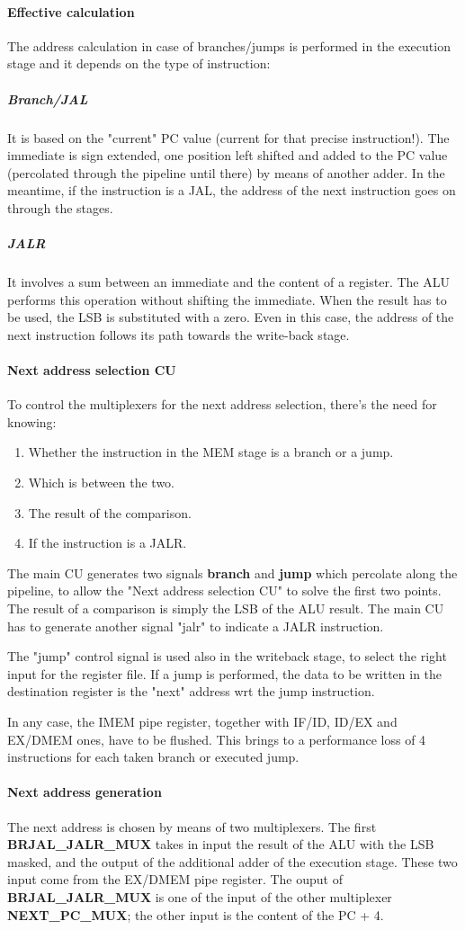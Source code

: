 \documentclass[a4paper]{article}
\begin{document}
\paragraph{Effective calculation}
The address calculation in case of branches/jumps is performed in the execution stage and it depends on the type of instruction:
\subparagraph{Branch/JAL} It is based on the "current" PC value (current for that precise instruction!). The immediate is sign extended, one position left shifted and added to the PC value (percolated through the pipeline until there) by means of another adder. In the meantime, if the instruction is a JAL, the address of the next instruction goes on through the stages.
\subparagraph{JALR} It involves a sum between an immediate and the content of a register. The ALU performs this operation without shifting the immediate. When the result has to be used, the LSB is substituted with a zero. Even in this case, the address of the next instruction follows its path towards the write-back stage.

\paragraph{Next address selection CU}
To control the multiplexers for the next address selection, there's the need for knowing:
\begin{enumerate}
	\item Whether the instruction in the MEM stage is a branch or a jump.
	\item Which is between the two.
	\item The result of the comparison.
	\item If the instruction is a JALR.
\end{enumerate}
The main CU generates two signals \textbf{branch} and \textbf{jump} which percolate along the pipeline, to allow the "Next address selection CU" to solve the first two points. The result of a comparison is simply the LSB of the ALU result. 
The main CU has to generate another signal "jalr" to indicate a JALR instruction.

The "jump" control signal is used also in the writeback stage, to select the right input for the register file. If a jump is performed, the data to be written in the destination register is the "next" address wrt the jump instruction. 

In any case, the IMEM pipe register, together with IF/ID, ID/EX and EX/DMEM ones, have to be flushed. This brings to a performance loss of 4 instructions for each taken branch or executed jump.

\paragraph{Next address generation}
The next address is chosen by means of two multiplexers. The first \textbf{BRJAL\_JALR\_MUX} takes in input the result of the ALU with the LSB masked, and the output of the additional adder of the execution stage. These two input come from the EX/DMEM pipe register. The ouput of \textbf{BRJAL\_JALR\_MUX} is one of the input of the other multiplexer \textbf{NEXT\_PC\_MUX}; the other input is the content of the PC + 4.
\end{document}

